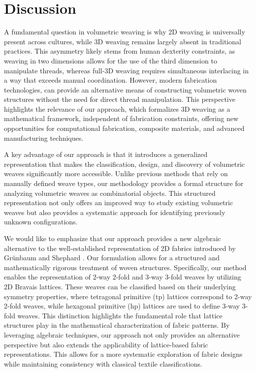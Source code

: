 \documentclass[unnumsec,webpdf,contemporary,large]{oup-authoring-template}%
\theoremstyle{thmstyleone}%
\theoremstyle{thmstyletwo}%
\theoremstyle{thmstylethree}%
\newcommand{\ergun}[1]{{\color{black} #1}}
\begin{document}
\section{Discussion}

\ergun{A fundamental question in volumetric weaving is why 2D weaving is universally present across cultures, while 3D weaving remains largely absent in traditional practices. This asymmetry likely stems from human dexterity constraints, as weaving in two dimensions allows for the use of the third dimension to manipulate threads, whereas full-3D weaving requires simultaneous interlacing in a way that exceeds manual coordination. However, modern fabrication technologies, can provide an alternative means of constructing volumetric woven structures without the need for direct thread manipulation. This perspective highlights the relevance of our approach, which formalizes 3D weaving as a mathematical framework, independent of fabrication constraints, offering new opportunities for computational fabrication, composite materials, and advanced manufacturing techniques.

A key advantage of our approach is that it introduces a generalized representation that makes the classification, design, and discovery of volumetric weaves significantly more accessible. Unlike previous methods that rely on manually defined weave types, our methodology provides a formal structure for analyzing volumetric weaves as combinatorial objects. This structured representation not only offers an improved way to study existing volumetric weaves but also provides a systematic approach for identifying previously unknown configurations.

We would like to emphasize that our approach provides a new algebraic alternative to the well-established representation of 2D fabrics introduced by Grünbaum and Shephard \cite{Grunbaum80,Grunbaum85, Grunbaum86,grunbaum1988isonemal}. Our formulation allows for a structured and mathematically rigorous treatment of woven structures.
Specifically, our method enables the representation of 2-way 2-fold and 3-way 3-fold weaves by utilizing 2D Bravais lattices. These weaves can be classified based on their underlying symmetry properties, where tetragonal primitive (tp) lattices correspond to 2-way 2-fold weaves, while hexagonal primitive (hp) lattices are used to define 3-way 3-fold weaves. This distinction highlights the fundamental role that lattice structures play in the mathematical characterization of fabric patterns.
By leveraging algebraic techniques, our approach not only provides an alternative perspective but also extends the applicability of lattice-based fabric representations. This allows for a more systematic exploration of fabric designs while maintaining consistency with classical textile classifications.

}
\end{document}
